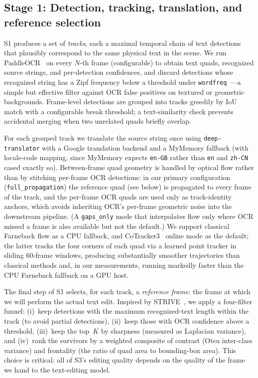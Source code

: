 \subsection{Stage 1: Detection, tracking, translation, and reference selection}
\label{sec:method:s1}

S1 produces a set of \emph{tracks}, each a maximal temporal chain
of text detections that plausibly correspond to the same physical
text in the scene. We run PaddleOCR~\citep{paddleocr2024} on every
$N$-th frame (configurable) to obtain text quads, recognized source
strings, and per-detection confidences, and discard detections
whose recognized string has a Zipf frequency below a threshold
under \texttt{wordfreq}~\citep{wordfreq}---a simple but effective
filter against OCR false positives on textured or geometric
backgrounds. Frame-level detections are grouped into tracks
greedily by IoU match with a configurable break threshold; a
text-similarity check prevents accidental merging when two
unrelated quads briefly overlap.

For each grouped track we translate the source string once using
\texttt{deep-translator} with a Google translation backend and a
MyMemory fallback (with locale-code mapping, since MyMemory
expects \texttt{en-GB} rather than \texttt{en} and \texttt{zh-CN}
cased exactly so). Between-frame quad geometry is handled by
optical flow rather than by stitching per-frame OCR detections: in
our primary configuration (\texttt{full\_propagation}) the
reference quad (see below) is propagated to every frame of the
track, and the per-frame OCR quads are used only as track-identity
anchors, which avoids inheriting OCR's per-frame geometric noise
into the downstream pipeline. (A \texttt{gaps\_only} mode that
interpolates flow only where OCR missed a frame is also available
but not the default.) We support classical Farneback flow as a CPU
fallback, and CoTracker3~\citep{karaev2024cotracker3} online mode
as the default; the latter tracks the four corners of each quad
via a learned point tracker in sliding 60-frame windows, producing
substantially smoother trajectories than classical methods and,
in our measurements, running markedly faster than the CPU
Farneback fallback on a GPU host.

The final step of S1 selects, for each track, a \emph{reference
frame}: the frame at which we will perform the actual text edit.
Inspired by STRIVE~\citep{subramanian2021strive}, we apply a
four-filter funnel: (i)~keep detections with the maximum
recognized-text length within the track (to avoid partial
detections), (ii)~keep those with OCR confidence above a threshold,
(iii)~keep the top~$K$ by sharpness (measured as Laplacian
variance), and (iv)~rank the survivors by a weighted composite of
contrast (Otsu inter-class variance) and frontality (the ratio of
quad area to bounding-box area). This choice is critical: all of
S3's editing quality depends on the quality of the frame we hand
to the text-editing model.


